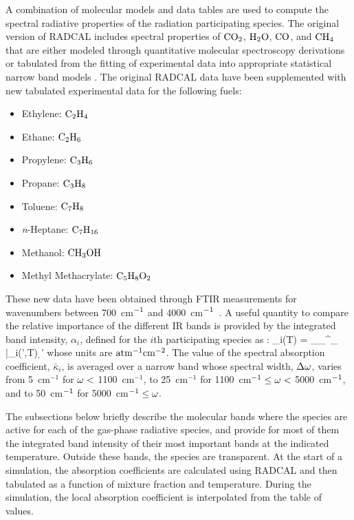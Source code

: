 A combination of molecular models and data tables are used to compute the spectral radiative properties of the radiation
participating species. The original version of RADCAL includes spectral properties of $\rm CO_2$, $\rm H_2O$, $\rm CO$, and $\rm
CH_4$ that are either modeled through quantitative molecular spectroscopy derivations or tabulated from the fitting of
experimental data into appropriate statistical narrow band models \cite{RadCal}. The original RADCAL data have been supplemented with new
tabulated experimental data for the following fuels:
\begin{itemize}
  \item Ethylene:  $\rm C_2H_4$
  \item Ethane:    $\rm C_2H_6$
  \item Propylene: $\rm C_3H_6$
  \item Propane:   $\rm C_3H_8$
  \item Toluene:   $\rm C_7H_8$
  \item \textit{n}-Heptane: $\rm C_7H_{16}$
  \item Methanol:  $\rm CH_3OH$
  \item Methyl Methacrylate: $\rm C_5H_8O_2$
\end{itemize}
These new data have been obtained through FTIR measurements for wavenumbers between 700~cm$\rm ^{-1}$ and 4000~cm$\rm
^{-1}$~\cite{Wakatsuki:2005,Wakatsuki:CST2008}. A useful quantity to compare the relative importance of the different IR bands is provided by the
integrated band intensity, $\alpha_i$, defined for the $i$th participating species as \cite{Matheson:1932}:
\be
  \alpha_i(T) = \displaystyle\int_{\om_{\min}}^{\om_{\max}} \bar{\kappa}_i(\om',T) \; \d \om'
\ee
whose units are $\rm {atm^{-1} cm^{-2}}$. The value of the spectral absorption coefficient, $\bar{\kappa}_i$, is averaged over a
narrow band whose spectral width, $\Delta \omega$, varies from 5~cm$^{-1}$ for $\omega < $ 1100~cm$^{-1}$, to 25~cm$^{-1}$ for
1100~cm$^{-1} \leq \omega < $ 5000~cm$^{\rm -1}$, and to 50~cm$^{\rm -1}$ for 5000~cm$^{\rm -1}\leq \omega$.

The subsections below briefly describe the molecular bands where the species are active for each of the gas-phase radiative
species, and provide for most of them the integrated band intensity of their most important bands at the indicated temperature.
Outside these bands, the species are transparent. At the start of a simulation, the absorption coefficients are calculated using
RADCAL and then tabulated as a function of mixture fraction and temperature. During the simulation, the local absorption
coefficient is interpolated from the table of values.

